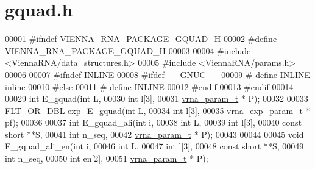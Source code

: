 \hypertarget{gquad_8h_source}{}\section{gquad.\+h}
\label{gquad_8h_source}

\begin{DoxyCode}
00001 \textcolor{preprocessor}{#ifndef VIENNA\_RNA\_PACKAGE\_GQUAD\_H}
00002 \textcolor{preprocessor}{#define VIENNA\_RNA\_PACKAGE\_GQUAD\_H}
00003 
00004 \textcolor{preprocessor}{#include <\hyperlink{data__structures_8h}{ViennaRNA/data\_structures.h}>}
00005 \textcolor{preprocessor}{#include <\hyperlink{params_8h}{ViennaRNA/params.h}>}
00006 
00007 \textcolor{preprocessor}{#ifndef INLINE}
00008 \textcolor{preprocessor}{#ifdef \_\_GNUC\_\_}
00009 \textcolor{preprocessor}{# define INLINE inline}
00010 \textcolor{preprocessor}{#else}
00011 \textcolor{preprocessor}{# define INLINE}
00012 \textcolor{preprocessor}{#endif}
00013 \textcolor{preprocessor}{#endif}
00014 
00029 \textcolor{keywordtype}{int}         E\_gquad(\textcolor{keywordtype}{int} L,
00030                     \textcolor{keywordtype}{int} l[3],
00031                     \hyperlink{group__energy__parameters_structvrna__param__s}{vrna\_param\_t} * P);
00032 
00033 \hyperlink{group__data__structures_ga31125aeace516926bf7f251f759b6126}{FLT\_OR\_DBL}  exp\_E\_gquad(\textcolor{keywordtype}{int} L,
00034                         \textcolor{keywordtype}{int} l[3],
00035                         \hyperlink{group__energy__parameters_structvrna__exp__param__s}{vrna\_exp\_param\_t} * pf);
00036 
00037 \textcolor{keywordtype}{int}         E\_gquad\_ali(\textcolor{keywordtype}{int} i,
00038                         \textcolor{keywordtype}{int} L,
00039                         \textcolor{keywordtype}{int} l[3],
00040                         \textcolor{keyword}{const} \textcolor{keywordtype}{short} **S,
00041                         \textcolor{keywordtype}{int} n\_seq,
00042                         \hyperlink{group__energy__parameters_structvrna__param__s}{vrna\_param\_t} * P);
00043 
00044 
00045 \textcolor{keywordtype}{void} E\_gquad\_ali\_en(\textcolor{keywordtype}{int} i,
00046                     \textcolor{keywordtype}{int} L,
00047                     \textcolor{keywordtype}{int} l[3],
00048                     \textcolor{keyword}{const} \textcolor{keywordtype}{short} **S,
00049                     \textcolor{keywordtype}{int} n\_seq,
00050                     \textcolor{keywordtype}{int} en[2],
00051                     \hyperlink{group__energy__parameters_structvrna__param__s}{vrna\_param\_t} * P);

\end{DoxyCode}
